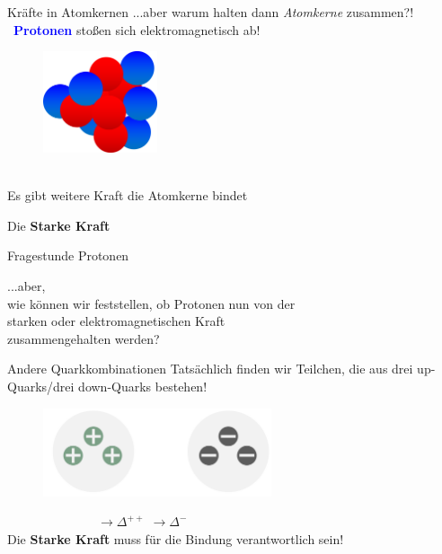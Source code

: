 \begin{frame}{Kräfte in Atomkernen}
...aber warum halten dann \emph{Atomkerne} zusammen?!\\ \, \hspace{2cm}  \textcolor{blue}{\textbf{Protonen}} stoßen sich elektromagnetisch ab!

    \begin{figure}[htb]
        \includegraphics[width=0.3\textwidth]{Figures Introductory Lecture/Standard Model/Nukleus.png}
        \label{fig:strong_force_2}
    \end{figure}\\
     Es gibt weitere Kraft die Atomkerne bindet\\ 
    \vspace{0.5cm}\begin{center}
    \Large{Die \textbf{Starke Kraft}}
    \end{center}
\end{frame}
\begin{frame}{Fragestunde Protonen}
\begin{center} \Large
        ...aber, \\ wie können wir feststellen, ob Protonen nun von der\\ starken oder elektromagnetischen Kraft \\zusammengehalten werden? 
\end{center}

\end{frame}
\begin{frame}{Andere Quarkkombinationen}
Tatsächlich finden wir Teilchen, die aus drei  up-Quarks/drei down-Quarks bestehen!
    \begin{figure}[htb]
        \includegraphics[width=0.6\textwidth]{Figures Introductory Lecture/Standard Model/DeltaBaryons.png}
        \label{fig:strong_force_2}
    \end{figure}
    $\hspace{3cm}\rightarrow \Delta^{++}$\hspace{3cm} $\rightarrow \Delta^{-}$\\ \vspace{0.5cm}
     Die \textbf{Starke Kraft} muss für die Bindung verantwortlich sein!
\end{frame}
